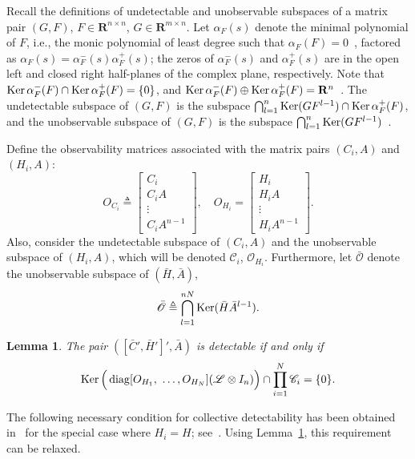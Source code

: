 \documentclass[a4paper,10pt,conference]{ieeeconf}
\newtheorem{lemma}{Lemma}
\begin{document}
Recall the definitions of undetectable and unobservable subspaces of a
matrix pair $(G,F)$, $F\in \mathbf{R}^{n\times n}$, $G\in  
  \mathbf{R}^{m\times n}$. Let $\alpha_F(s)$ denote the minimal polynomial
    of $F$, i.e., the monic polynomial of least degree such that
$\alpha_F(F)=0$~\cite{Wonham}, factored as 
$\alpha_F(s)=\alpha_F^-(s)\alpha_F^+(s)$; the zeros of
$\alpha_F^-(s)$ and $\alpha_F^+(s)$ are in the open left and closed right
half-planes of the complex plane, respectively. Note that
$\mathop{\mathrm{Ker}}\nolimits\alpha_F^-(F)\cap \mathop{\mathrm{Ker}}\nolimits\alpha_F^+(F)=\{0\}$, and  $\mathop{\mathrm{Ker}}\nolimits\alpha_F^-(F)\oplus 
\mathop{\mathrm{Ker}}\nolimits\alpha_F^+(F)= \mathbf{R}^n$~\cite{Wonham}. The undetectable subspace
of $(G,F)$ is the subspace $\bigcap_{l=1}^n\mathop{\mathrm{Ker}}\nolimits(GF^{l-1})\cap
\mathop{\mathrm{Ker}}\nolimits\alpha_F^+(F)$, and the unobservable subspace of $(G,F)$
is the subspace $\bigcap_{l=1}^n\mathop{\mathrm{Ker}}\nolimits(GF^{l-1})$~\cite{CD-1991}.       

Define the observability matrices associated with the matrix pairs
$(C_i,A)$ and $(H_i,A)$:
\[
O_{C_i}\triangleq \left[\begin{array}{c} C_i \\ C_i A \\ \vdots \\
    C_i A^{n-1}
  \end{array}\right], \quad 
O_{H_i}=\left[\begin{array}{c} H_i \\ H_i A \\
     \vdots \\ H_i A^{n-1}
\end{array}\right].
\]
Also, consider the undetectable subspace of $(C_i, A)$
and the unobservable subspace of $(H_i,A)$, which
will be denoted $\mathcal{C}_i$, $\mathcal{O}_{H_i}$. Furthermore, let
$\bar{\mathcal{O}}$ denote the unobservable subspace of $(\bar H, \bar A)$,  
\[
\bar{\mathcal{O}}\triangleq \bigcap_{l=1}^{nN}\mathop{\mathrm{Ker}}\nolimits(\bar H\bar A^{l-1}). 
\]

\begin{lemma}\label{lemma.barO}
The pair $([\bar C',\bar H']',\bar A)$ is detectable if and only if 
\begin{eqnarray}
\mathop{\mathrm{Ker}}\nolimits\Big(\mathop{\mathrm{diag}}\nolimits[O_{H_1},~\ldots,O_{H_N}](\mathcal{L}\otimes I_n)\Big)\cap \prod_{i=1}^N\mathcal{C}_i =\{0\}.
\label{undetect.C.1}
\end{eqnarray}
\end{lemma}


The following necessary condition for collective detectability has been
obtained in~\cite{U7b-journal} for the special case where $H_i=H$;
see~\cite[Theorem 3]{U7b-journal}. Using Lemma~\ref{lemma.barO}, this
requirement can be relaxed.  
\end{document}
